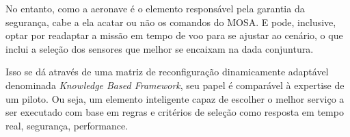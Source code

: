 
No entanto, como a aeronave é o elemento responsável pela garantia da segurança, cabe a ela acatar ou não os comandos do MOSA. E pode, inclusive, 
optar por readaptar a missão em tempo de voo para se ajustar ao cenário, o que inclui a seleção dos sensores que melhor se encaixam na dada 
conjuntura.

Isso se dá através de uma matriz de reconfiguração dinamicamente adaptável denominada \textit{Knowledge Based Framework}, seu papel é comparável à 
expertise de um piloto.
Ou seja, um elemento inteligente capaz de escolher o melhor serviço  a ser executado com base em regras e critérios de seleção como resposta em tempo 
real, segurança, performance.


% 
% 
% 
